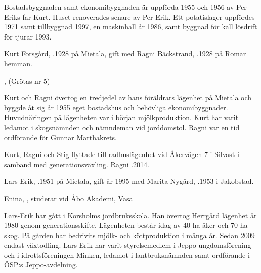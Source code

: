 Bostadsbyggnaden samt ekonomibyggnaden är uppförda 1955 och 1956 av Per-Eriks far Kurt. Huset renoverades senare av Per-Erik. Ett potatislager uppfördes 1971 samt tillbyggnad 1997, en maskinhall år 1986, samt byggnad för kall lösdrift för tjurar 1993.


%
Kurt Forsgård, .1928 på Mietala, gift med Ragni Bäckstrand, .1928 på Romar hemman.
\begin{jhchildren}
  \item {}, (Grötas nr 5)
  \item {}
\end{jhchildren}

Kurt och Ragni övertog en tredjedel av hans föräldrars lägenhet på Mietala och byggde åt sig år 1955 eget bostadshus och behövliga ekonomibyggnader. Huvudnäringen på lägenheten var i början mjölkproduktion. Kurt har varit ledamot i skogsnämnden och nämndeman vid jorddomstol. Ragni var en tid ordförande för Gunnar Marthakrets.

Kurt, Ragni och Stig flyttade till radhuslägenhet vid Åkervägen 7 i Silvast i samband med generationsväxling. Ragni .2014.



%



%
Lars-Erik, .1951 på Mietala, gift år 1995 med Marita Nygård, .1953 i Jakobstad.
\begin{jhchildren}
  \item Enina, , studerar vid Åbo Akademi, Vasa
\end{jhchildren}

Lars-Erik har gått i Korsholms jordbruksskola. Han övertog Herrgård	lägenhet år 1980 genom generationsskifte. Lägenheten består idag av 40 ha åker och 70 ha skog. På gården har bedrivits mjölk- och köttproduktion i många år. Sedan 2009 endast växtodling. Lars-Erik har varit styrelsemedlem i Jeppo ungdomsförening och i idrottsföreningen Minken, ledamot i lantbruksnämnden samt ordförande i ÖSP:s Jeppo-avdelning.

